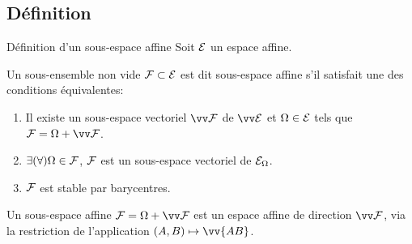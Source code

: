 \documentclass[bigger]{m53beamer}
\begin{document}
\subsection{Définition}
  \begin{frame}{Définition d'un sous-espace affine}
      Soit $\mathcal{E}$ un espace affine.
      \begin{defprop}
      Un sous-ensemble non vide $\mathcal{F} \subset \mathcal{E}$ est dit \alert{sous-espace affine} s'il satisfait une des conditions équivalentes:
      \begin{enumerate}[<+(1)->]
        \item Il existe un sous-espace vectoriel $\ev{F}$ de $\ev{E}$ et $\Omega \in \mathcal{E}$ tels que $\ens{F}=\Omega+\ev{F}$.
        \item $\exists (\forall)\Omega \in \mathcal{F}$, $\mathcal{F}$ est un sous-espace vectoriel de $\mathcal{E}_{\Omega}$.
        \item $\mathcal{F}$ est stable par barycentres.
      \end{enumerate}
    \end{defprop}\pause
    Un sous-espace affine $\ens{F}=\Omega+\ev{F}$ est un espace affine de direction $\ev{F}$, via la restriction de l'application $(A,B)\mapsto\vv{AB}$.
  \end{frame}
\end{document}
